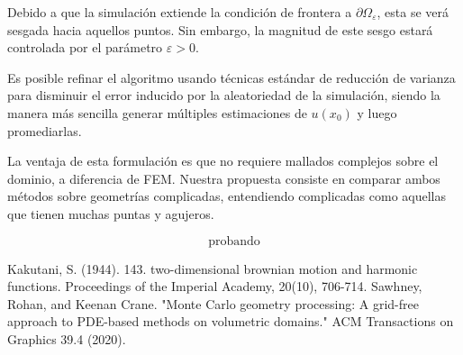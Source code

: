 \documentclass{article}
\begin{document}
Debido a que la simulación extiende la condición de frontera a $\partial \Omega_{\varepsilon}$, esta se verá sesgada hacia aquellos puntos. Sin embargo, la magnitud de este sesgo estará controlada por el parámetro $\varepsilon>0$.

Es posible refinar el algoritmo usando técnicas estándar de reducción de varianza para disminuir el error inducido por la aleatoriedad de la simulación, siendo la manera más sencilla generar múltiples estimaciones de $u(x_0)$ y luego promediarlas.

La ventaja de esta formulación es que no requiere mallados complejos sobre el
dominio, a diferencia de FEM. Nuestra propuesta consiste en comparar ambos métodos
sobre geometrías complicadas, entendiendo complicadas como aquellas que tienen
muchas puntas y agujeros.


$$\text{probando}$$

\begin{thebibliography}{9}
Kakutani, S. (1944). 143. two-dimensional brownian motion and harmonic functions. Proceedings of the Imperial Academy, 20(10), 706-714.
Sawhney, Rohan, and Keenan Crane. "Monte Carlo geometry processing: A grid-free approach to PDE-based methods on volumetric domains." ACM Transactions on Graphics 39.4 (2020).
\end{thebibliography}
\end{document}
